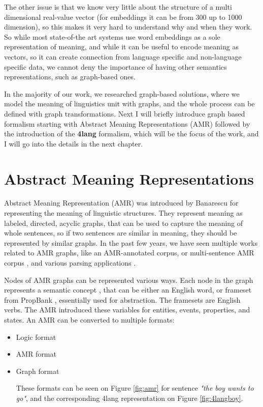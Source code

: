 The other issue is that we know very little about the structure of a multi dimensional real-value vector (for embeddings it can be from 300 up to 1000 dimension), so this makes it very hard to understand why and when they work. So while most state-of-the art systems use word embeddings as a sole representation of meaning, and while it can be useful to encode meaning as vectors, so it can create connection from language specific and non-language specific data, we cannot deny the importance of having other semantics representations, such as graph-based ones. 

In the majority of our work, we researched graph-based solutions, where we model the meaning of linguistics unit with graphs, and the whole process can be defined with graph transformations. Next I will briefly introduce graph based formalism starting with Abstract Meaning Representations (AMR) followed by the introduction of the \textbf{4lang} formalism, which will be the focus of the work, and I will go into the details in the next chapter.

\section{Abstract Meaning Representations}
Abstract Meaning Representation (AMR) was introduced by Banarescu\cite{Banarescu:2013} for representing the meaning of linguistic structures. They represent meaning as labeled, directed, acyclic graphs, that can be used to capture the meaning of whole sentences, so if two sentences are similar in meaning, they should be represented by similar graphs. In the past few years, we have seen multiple works related to AMR graphs, like an AMR-annotated corpus\cite{Banarescu:2013}, or multi-sentence AMR corpus \cite{OGorman2018AMRBT}, and various parsing applications \cite{DAC:2017} \cite{Vanderwende:2015}.

Nodes of AMR graphs can be represented various ways. Each node in the graph represents a semantic concept \cite{AMR:2015}, that can be either an English word, or frameset from PropBank \cite{Palmer:2005}, essentially used for abstraction. The framesets are English verbs. The AMR introduced these variables for entities, events, properties, and states. An AMR can be converted to multiple formats:
\begin{itemize}
	\item Logic format
	\item AMR format
	\item Graph format
	
	These formats can be seen on Figure \ref{fig:amr} for sentence \textit{"the boy wants to go"}, and the corresponding 4lang representation on Figure \ref{fig:4langboy}.
	
\end{itemize}

